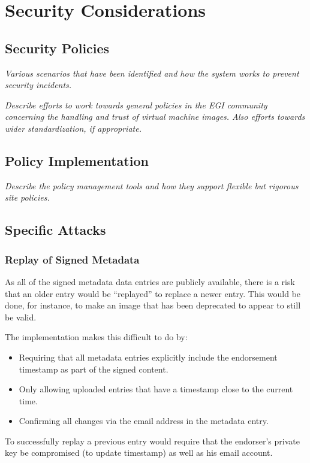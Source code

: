\section{Security Considerations}
\label{sec:security}

\subsection{Security Policies}

{\em Various scenarios that have been identified and how the system
  works to prevent security incidents.}

{\em Describe efforts to work towards general policies in the EGI
  community concerning the handling and trust of virtual machine
  images.  Also efforts towards wider standardization, if
  appropriate.}

\subsection{Policy Implementation}

{\em Describe the policy management tools and how they support
  flexible but rigorous site policies.}

\subsection{Specific Attacks}

\subsubsection{Replay of Signed Metadata}

As all of the signed metadata data entries are publicly available,
there is a risk that an older entry would be ``replayed'' to replace a
newer entry.  This would be done, for instance, to make an image that
has been deprecated to appear to still be valid.

The implementation makes this difficult to do by:
\begin{itemize}
\item Requiring that all metadata entries explicitly include the
  endorsement timestamp as part of the signed content.
\item Only allowing uploaded entries that have a timestamp close to
  the current time.
\item Confirming all changes via the email address in the metadata
  entry.
\end{itemize}
To successfully replay a previous entry would require that the
endorser's private key be compromised (to update timestamp) as well as
his email account.

